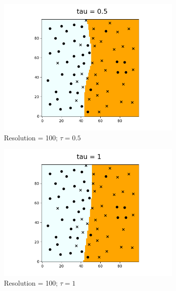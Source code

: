\documentclass{article}
\begin{document}
\begin{figure}[!htb]
    \begin{subfigure}{0.3\textwidth}
        \centering
        \includegraphics[width=\linewidth]{res_100_tau_0point5}
        \caption{Resolution = 100; \(\tau = 0.5\)  }
        \label{fig:subfig7}
      \end{subfigure}%
      \hfill
      \begin{subfigure}{0.3\textwidth}
        \centering
        \includegraphics[width=\linewidth]{res_100_tau_1}
        \caption{Resolution = 100; \(\tau=1\) }
        \label{fig:subfig8}
      \end{subfigure}%
      \hfill
      \begin{subfigure}{0.3\textwidth}
        \centering

\end{subfigure}
\end{figure}
\end{document}
